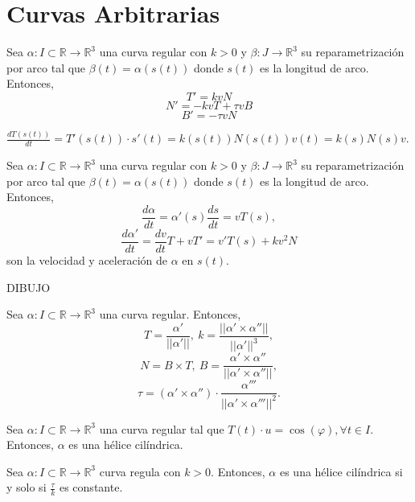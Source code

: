 \section{Curvas Arbitrarias}

\begin{prop}
  Sea $\alpha  : I \subset \mathbb{R} \to \mathbb{R}^{3}$ una curva regular con $k>0$ y $\beta: J \to \mathbb{R}^{3}$ su reparametrización por arco tal que $\beta(t) = \alpha(s(t))$ donde $s(t)$ es la longitud de arco. Entonces, 
  \[ 
    T' = kvN 
  \] 
  \[ 
    N' = -kvT + \tau v B 
  \]
  \[ 
    B' = -\tau v N 
  \]
\end{prop}

\begin{dem}
  $\frac{d{T(s(t))}}{d{t}} = T'(s(t)) \cdot s'(t) = k(s(t)) N(s(t)) v(t) = k(s) N(s) v$.
\end{dem}

\begin{prop}
  Sea $\alpha  : I \subset \mathbb{R} \to \mathbb{R}^{3}$ una curva regular con $k>0$ y $\beta: J \to \mathbb{R}^{3}$ su reparametrización por arco tal que $\beta(t) = \alpha(s(t))$ donde $s(t)$ es la longitud de arco. Entonces, 
  \[ 
    \frac{d{\alpha}}{d{t}} = \alpha'(s) \frac{d{s}}{d{t}} = v T(s),
  \] 
  \[ 
    \frac{d{\alpha'}}{d{t}} = \frac{d{v}}{d{t}}T + vT' = v'T(s) + kv^{2}N 
  \] 
  son la velocidad y aceleración de $\alpha$ en $s(t)$.
\end{prop}

DIBUJO

\begin{theo}
  Sea $\alpha  : I \subset \mathbb{R} \to \mathbb{R}^{3}$ una curva regular. Entonces,
  \[ 
    T = \frac{\alpha'}{||\alpha'||}, \ k = \frac{||\alpha' \times \alpha''||}{||\alpha'||^{3}},
  \] 
  \[ 
    N = B \times T , \ B = \frac{\alpha' \times \alpha''}{||\alpha' \times \alpha''||},
  \] 
  \[ 
    \tau = (\alpha' \times \alpha'') \cdot \frac{\alpha'''}{||\alpha' \times \alpha'''||^{2}} .
  \] 
\end{theo}

\begin{defn}
  Sea $\alpha  : I \subset \mathbb{R} \to \mathbb{R}^{3}$ una curva regular tal que $ T(t) \cdot u = \cos(\varphi), \forall t \in I$. Entonces, $\alpha$ es una hélice cilíndrica.
\end{defn}

\begin{theo}
  Sea $\alpha  : I \subset \mathbb{R} \to \mathbb{R}^{3}$ curva regula con $k>0$. Entonces, $\alpha$ es una hélice cilíndrica si y solo si $\frac{\tau}{k}$ es constante.
\end{theo}

